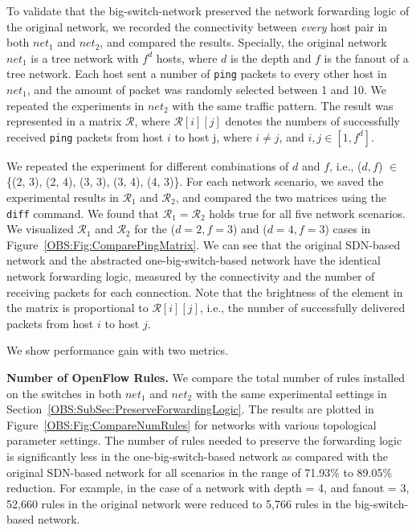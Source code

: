 To validate that the big-switch-network preserved the network forwarding logic of the original network,
we recorded the connectivity between \emph{every} host pair in both $net_1$ and $net_2$,
and compared the results.
Specially, the original network $net_1$ is a tree network with $f^d$ hosts,
where $d$ is the depth and $f$ is the fanout of a tree network.
Each host sent a number of \texttt{ping} packets to every other host in $net_1$,
and the amount of packet was randomly selected between 1 and 10.
We repeated the experiments in $net_2$ with the same traffic pattern.
The result was represented in a matrix $\mathcal{R}$,
where $\mathcal{R}[i][j]$ denotes the numbers of successfully received \texttt{ping}
packets from host $i$ to host j, where $i \neq j$, and $i, j \in [1, f^d]$.


We repeated the experiment for different combinations of $d$ and $f$, i.e., ($d, f$) $\in$
\{(2, 3), (2, 4), (3, 3), (3, 4), (4, 3)\}. For each network scenario,
we saved the experimental results in $\mathcal{R}_1$ and $\mathcal{R}_2$, and compared the two matrices using the \texttt{diff} command.
We found that $\mathcal{R}_1 = \mathcal{R}_2$ holds true for all five network scenarios.
We visualized $\mathcal{R}_1$ and $\mathcal{R}_2$ for the ($d=2, f=3$) and ($d=4, f=3$) cases
in Figure~\ref{OBS:Fig:ComparePingMatrix}.
We can see that the original SDN-based network and the abstracted one-big-switch-based
network have the identical network forwarding logic,
measured by the connectivity and the number of receiving packets for each connection.
Note that the brightness of the element in the matrix is proportional to $\mathcal{R}[i][j]$,
i.e., the number of successfully delivered packets from host $i$ to host $j$.

We show performance gain with two metrics.

\textbf{Number of OpenFlow Rules.} We compare the total number of rules installed
on the switches in both $net_1$ and $net_2$ with the same experimental settings
in Section~\ref{OBS:SubSec:PreserveForwardingLogic}.
The results are plotted in Figure~\ref{OBS:Fig:CompareNumRules} for networks with
various topological parameter settings.
The number of rules needed to preserve the forwarding logic is significantly
less in the one-big-switch-based network as compared with the original SDN-based network
for all scenarios in the range of 71.93\% to 89.05\% reduction.
For example, in the case of a network with depth = 4, and fanout = 3, 52,660 rules
in the original network were reduced to 5,766 rules in the big-switch-based network.


